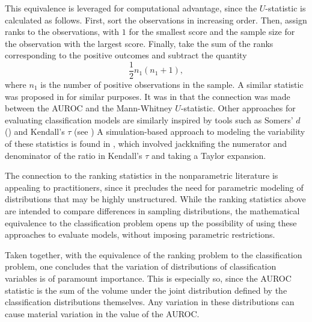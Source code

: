 This equivalence is leveraged for computational advantage, since the $U$-statistic is calculated as follows.
First, sort the observations in increasing order.
Then, assign ranks to the observations, with $1$ for the smallest score and the sample size for the observation with the largest score.
Finally, take the sum of the ranks corresponding to the positive outcomes and subtract the quantity
\begin{equation}
    \frac{1}{2} n_1(n_1 + 1),
\end{equation}
%
\noindent where $n_1$ is the number of positive observations in the sample.
%
A similar statistic was proposed in \citet{wilcoxon1945} for similar purposes.
It was in
\citet{bamber1975} that the connection was made between the AUROC and the Mann-Whitney $U$-statistic.
Other approaches for evaluating classification models are similarly inspired by tools such as
Somers' $d$ (\citet{somers1962}) and Kendall's $\tau$ (see \citet{kendall1990})
A simulation-based approach to modeling the variability of these statistics is found in \citet{newson2006}, which involved jackknifing the numerator and denominator of the ratio in Kendall's $\tau$ and taking a Taylor expansion.

The connection to the ranking statistics in the nonparametric literature is appealing to practitioners, since it precludes the need for parametric modeling of distributions that may be highly unstructured.
While the ranking statistics above are intended to compare differences in sampling distributions, the mathematical equivalence to the classification problem opens up the possibility of using these approaches to evaluate models, without imposing parametric restrictions.


Taken together, with the equivalence of the ranking problem to the classification problem,
%
one concludes that the variation of distributions of classification variables is of paramount importance.
This is especially so, since the AUROC statistic is the sum of the volume under the joint distribution defined by the classification distributions themselves.
Any variation in these distributions can cause material variation in the value of the AUROC.



